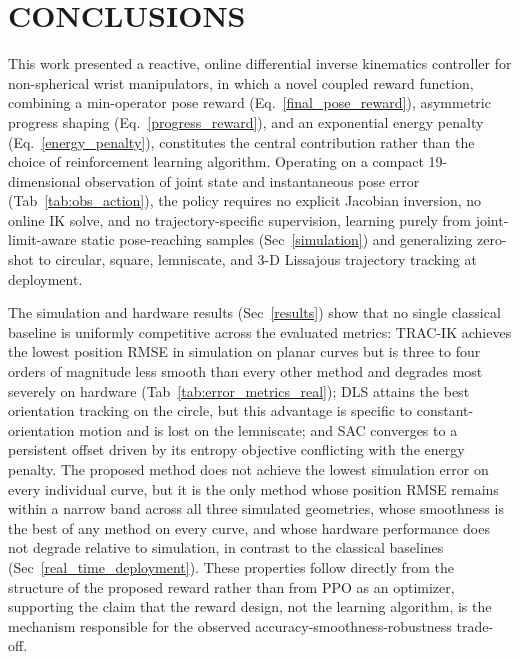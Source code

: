 \documentclass[preprint,12pt]{elsarticle}
\begin{document}
\section{CONCLUSIONS}
\label{conclusion}
This work presented a reactive, online differential inverse kinematics
controller for non-spherical wrist manipulators, in which a novel coupled
reward function, combining a min-operator pose reward (Eq.~\ref{final_pose_reward}), asymmetric
progress shaping (Eq.~\ref{progress_reward}), and an exponential energy penalty (Eq.~\ref{energy_penalty}),
constitutes the central contribution rather than the choice of reinforcement
learning algorithm. Operating on a compact 19-dimensional observation of
joint state and instantaneous pose error (Tab~\ref{tab:obs_action}), the policy requires no explicit Jacobian inversion, no online IK solve, and no trajectory-specific supervision, learning purely from joint-limit-aware static pose-reaching samples (Sec~\ref{simulation}) and generalizing zero-shot to circular, square, lemniscate, and 3-D Lissajous trajectory tracking at deployment.

The simulation and hardware results (Sec~\ref{results}) show that no single classical baseline is uniformly competitive across the evaluated metrics: TRAC-IK achieves the lowest position RMSE in simulation on planar curves but is three to four orders of magnitude less smooth than every other method and degrades most severely on hardware (Tab~\ref{tab:error_metrics_real}); DLS attains the best orientation tracking on the circle, but this advantage is specific
to constant-orientation motion and is lost on the lemniscate; and SAC
converges to a persistent offset driven by its entropy objective conflicting with the energy penalty. The proposed method does not achieve the lowest simulation error on every individual curve, but it is the only method whose position RMSE remains within a narrow band across all three simulated geometries, whose smoothness is the best of any method on every curve, and whose hardware performance does not degrade relative to simulation, in contrast to the classical baselines (Sec~\ref{real_time_deployment}). These properties follow directly from the structure of the proposed reward rather than from PPO as an optimizer, supporting the claim that the reward design, not the learning algorithm, is the mechanism responsible for the observed accuracy-smoothness-robustness trade-off.
\end{document}
